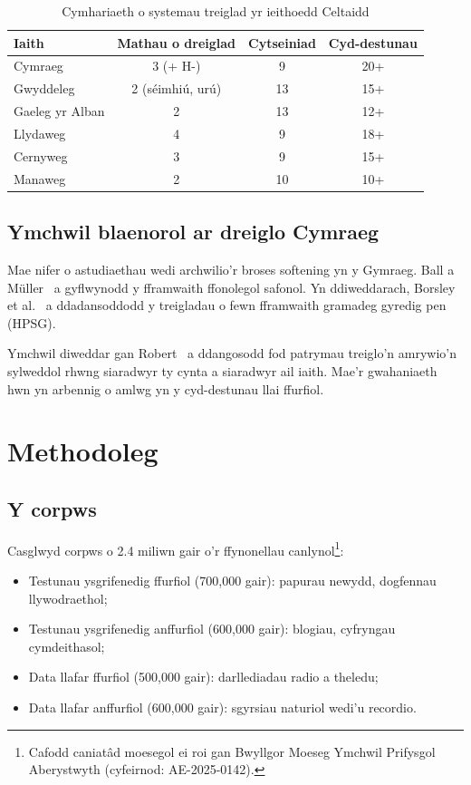 \documentclass[12pt,a4paper]{article}
\begin{document}
\begin{table}[ht]
\centering
\caption{Cymhariaeth o systemau treiglad yr ieithoedd Celtaidd}
\label{tab:celtaidd}
\begin{tabular}{lccc}
\toprule
Iaith & Mathau o dreiglad & Cytseiniad & Cyd-destunau \\
\midrule
Cymraeg & 3 (+ H-) & 9 & 20+ \\
Gwyddeleg & 2 (s\'{e}imhi\'{u}, ur\'{u}) & 13 & 15+ \\
Gaeleg yr Alban & 2 & 13 & 12+ \\
Llydaweg & 4 & 9 & 18+ \\
Cernyweg & 3 & 9 & 15+ \\
Manaweg & 2 & 10 & 10+ \\
\bottomrule
\end{tabular}
\end{table}

\subsection{Ymchwil blaenorol ar dreiglo Cymraeg}

Mae nifer o astudiaethau wedi archwilio'r broses softening yn
y Gymraeg. Ball a M\"uller~\citep{ball1992} a gyflwynodd y
fframwaith ffonolegol safonol. Yn ddiweddarach,
Borsley et al.~\citep{borsley2007} a ddadansoddodd y
treigladau o fewn fframwaith gramadeg gyredig pen (HPSG).

Ymchwil diweddar gan Robert~\citep{robert2020} a ddangosodd
fod patrymau treiglo'n amrywio'n sylweddol rhwng siaradwyr
ty cynta a siaradwyr ail iaith. Mae'r gwahaniaeth hwn yn
arbennig o amlwg yn y cyd-destunau llai ffurfiol.

\section{Methodoleg}
\label{sec:methodoleg}

\subsection{Y corpws}

Casglwyd corpws o 2.4 miliwn gair o'r ffynonellau canlynol\footnote{%
Cafodd caniat\^{a}d moesegol ei roi gan Bwyllgor Moeseg Ymchwil
Prifysgol Aberystwyth (cyfeirnod: AE-2025-0142).}:
\begin{itemize}
  \item Testunau ysgrifenedig ffurfiol (700,000 gair):
        papurau newydd, dogfennau llywodraethol;
  \item Testunau ysgrifenedig anffurfiol (600,000 gair):
        blogiau, cyfryngau cymdeithasol;
  \item Data llafar ffurfiol (500,000 gair):
        darllediadau radio a theledu;
  \item Data llafar anffurfiol (600,000 gair):
        sgyrsiau naturiol wedi'u recordio.
\end{itemize}
\end{document}
